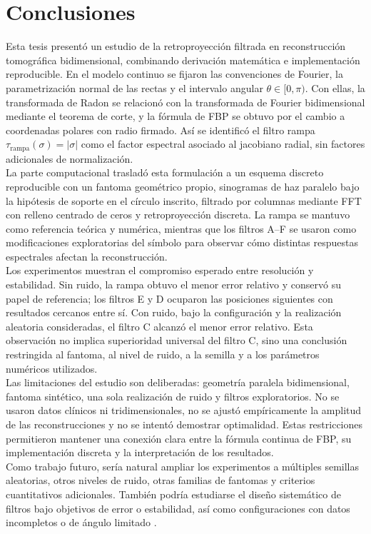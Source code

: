 \chapter{Conclusiones}

Esta tesis presentó un estudio de la retroproyección filtrada en reconstrucción tomográfica bidimensional, combinando derivación matemática e implementación reproducible. En el modelo continuo se fijaron las convenciones de Fourier, la parametrización normal de las rectas y el intervalo angular $\theta\in[0,\pi)$. Con ellas, la transformada de Radon se relacionó con la transformada de Fourier bidimensional mediante el teorema de corte, y la fórmula de FBP se obtuvo por el cambio a coordenadas polares con radio firmado. Así se identificó el filtro rampa $\tau_{\mathrm{rampa}}(\sigma)=|\sigma|$ como el factor espectral asociado al jacobiano radial, sin factores adicionales de normalización.\\

La parte computacional trasladó esta formulación a un esquema discreto reproducible con un fantoma geométrico propio, sinogramas de haz paralelo bajo la hipótesis de soporte en el círculo inscrito, filtrado por columnas mediante FFT con relleno centrado de ceros y retroproyección discreta. La rampa se mantuvo como referencia teórica y numérica, mientras que los filtros A--F se usaron como modificaciones exploratorias del símbolo para observar cómo distintas respuestas espectrales afectan la reconstrucción.\\

Los experimentos muestran el compromiso esperado entre resolución y estabilidad. Sin ruido, la rampa obtuvo el menor error relativo y conservó su papel de referencia; los filtros E y D ocuparon las posiciones siguientes con resultados cercanos entre sí. Con ruido, bajo la configuración y la realización aleatoria consideradas, el filtro C alcanzó el menor error relativo. Esta observación no implica superioridad universal del filtro C, sino una conclusión restringida al fantoma, al nivel de ruido, a la semilla y a los parámetros numéricos utilizados.\\

Las limitaciones del estudio son deliberadas: geometría paralela bidimensional, fantoma sintético, una sola realización de ruido y filtros exploratorios. No se usaron datos clínicos ni tridimensionales, no se ajustó empíricamente la amplitud de las reconstrucciones y no se intentó demostrar optimalidad. Estas restricciones permitieron mantener una conexión clara entre la fórmula continua de FBP, su implementación discreta y la interpretación de los resultados.\\

Como trabajo futuro, sería natural ampliar los experimentos a múltiples semillas aleatorias, otros niveles de ruido, otras familias de fantomas y criterios cuantitativos adicionales. También podría estudiarse el diseño sistemático de filtros bajo objetivos de error o estabilidad, así como configuraciones con datos incompletos o de ángulo limitado \cite{quinto1993,frikel_quinto2013}.
